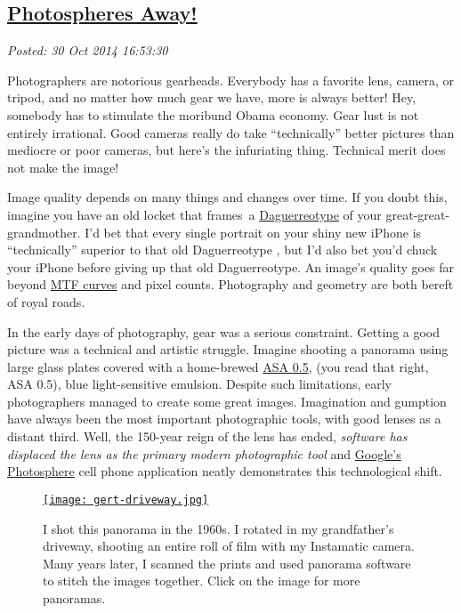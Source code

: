 %

\subsection*{\href{https://bakerjd99.wordpress.com/2014/10/30/photospheres-away-2/}{Photospheres Away!}}


\noindent\emph{Posted: 30 Oct 2014 16:53:30}
\vspace{6pt}

Photographers are notorious gearheads. Everybody has a favorite lens,
camera, or tripod, and no matter how much gear we have, more is always
better! Hey, somebody has to stimulate the moribund Obama economy. Gear
lust is not entirely irrational. Good cameras really do take
``technically'' better pictures than mediocre or poor cameras, but here's
the infuriating thing. Technical merit does not make the image!

Image quality depends on many things and changes over time. If you doubt
this, imagine you have an old locket that frames~a
\href{https://en.wikipedia.org/wiki/Daguerreotype}{Daguerreotype} of
your great-great-grandmother. I'd bet that every single portrait on your
shiny new iPhone is ``technically'' superior to that old Daguerreotype
, but I'd also bet you'd chuck your iPhone before giving up that old
Daguerreotype. An image's quality goes far beyond
\href{http://photographylife.com/how-to-read-mtf-charts}{MTF curves} and
pixel counts. Photography and geometry are both bereft of royal roads.

In the early days of photography, gear was a serious constraint. Getting
a good picture was a technical and artistic struggle. Imagine shooting a
panorama using large glass plates covered with a home-brewed
\href{http://www.alternativephotography.com/wp/processes/gelatin-silver/silver-gelatin-dry-plate-process}{ASA
0.5}, (you read that right, ASA 0.5), blue light-sensitive emulsion.
Despite such limitations, early photographers managed to create some
great images. Imagination and gumption have always been the most
important photographic tools, with good lenses as a distant third. Well,
the 150-year reign of the lens has ended, \emph{software has displaced
the lens as the primary modern photographic tool} and
\href{https://itunes.apple.com/us/app/photo-sphere-camera/id904418768}{Google's
Photosphere} cell phone application neatly demonstrates this
technological shift.

\captionsetup[figure]{labelformat=empty}
\begin{figure}[htbp]
\centering
\href{http://conceptcontrol.smugmug.com/Themes/Manipulations/Panoramas-1}{\texttt{[image: gert-driveway.jpg]}}
\caption[I shot this panorama in the 1960s]{I shot this panorama in the 1960s. I rotated in my grandfather's
driveway, shooting an entire roll of film with my Instamatic camera. Many
years later, I scanned the prints and used panorama software to stitch
the images together. Click on the image for more
panoramas.}
\label{fig:4832X0}
\end{figure}


